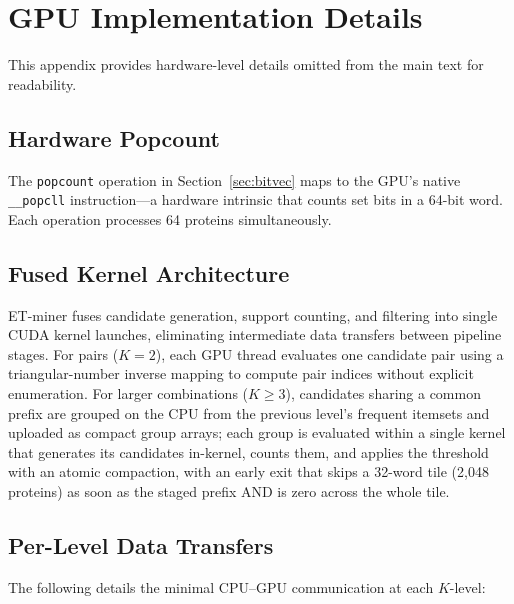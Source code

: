 \documentclass[10pt,a4paper,twocolumn]{article}
\begin{document}
\clearpage
\section{GPU Implementation Details}
\label{app:gpu-details}

This appendix provides hardware-level details omitted from the main text for readability.

\subsection{Hardware Popcount}

The \texttt{popcount} operation in Section~\ref{sec:bitvec} maps to the GPU's native \texttt{\_\_popcll} instruction---a hardware intrinsic that counts set bits in a 64-bit word. Each operation processes 64 proteins simultaneously.

\subsection{Fused Kernel Architecture}

ET-miner fuses candidate generation, support counting, and filtering into single CUDA kernel launches, eliminating intermediate data transfers between pipeline stages. For pairs ($K{=}2$), each GPU thread evaluates one candidate pair using a triangular-number inverse mapping to compute pair indices without explicit enumeration. For larger combinations ($K{\geq}3$), candidates sharing a common prefix are grouped on the CPU from the previous level's frequent itemsets and uploaded as compact group arrays; each group is evaluated within a single kernel that generates its candidates in-kernel, counts them, and applies the threshold with an atomic compaction, with an early exit that skips a 32-word tile (2,048 proteins) as soon as the staged prefix AND is zero across the whole tile.

\subsection{Per-Level Data Transfers}

The following details the minimal CPU--GPU communication at each $K$-level:
\end{document}
